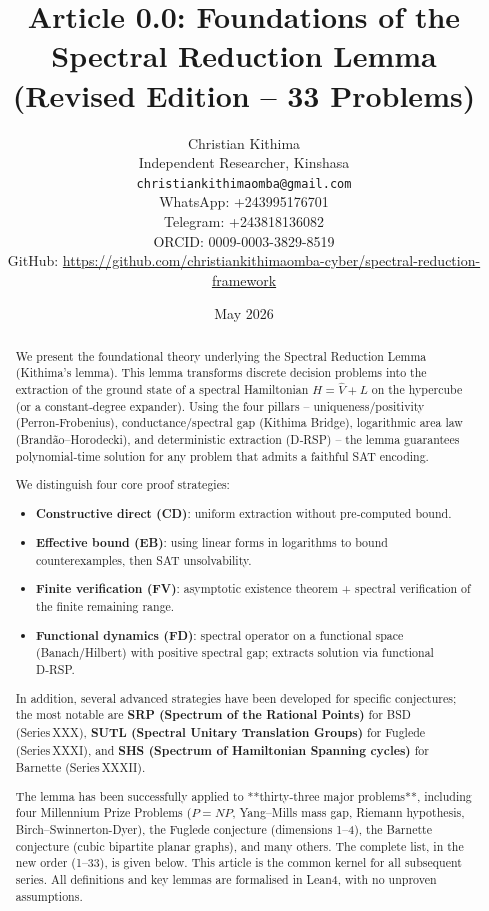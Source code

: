 \documentclass[11pt,a4paper]{article}
\title{Article 0.0: Foundations of the Spectral Reduction Lemma (Revised Edition – 33 Problems)}
\author{Christian Kithima \\
Independent Researcher, Kinshasa \\
\texttt{christiankithimaomba@gmail.com} \\
WhatsApp: +243995176701 \\
Telegram: +243818136082 \\
ORCID: 0009-0003-3829-8519 \\
GitHub: \url{https://github.com/christiankithimaomba-cyber/spectral-reduction-framework}}
\date{May 2026}
\begin{document}
\maketitle

\begin{abstract}
We present the foundational theory underlying the Spectral Reduction Lemma (Kithima's lemma). This lemma transforms discrete decision problems into the extraction of the ground state of a spectral Hamiltonian \(H = \hat{V} + L\) on the hypercube (or a constant‑degree expander). Using the four pillars – uniqueness/positivity (Perron‑Frobenius), conductance/spectral gap (Kithima Bridge), logarithmic area law (Brandão–Horodecki), and deterministic extraction (D‑RSP) – the lemma guarantees polynomial‑time solution for any problem that admits a faithful SAT encoding. 

We distinguish four core proof strategies:
\begin{itemize}
\item \textbf{Constructive direct (CD)}: uniform extraction without pre‑computed bound.
\item \textbf{Effective bound (EB)}: using linear forms in logarithms to bound counterexamples, then SAT unsolvability.
\item \textbf{Finite verification (FV)}: asymptotic existence theorem + spectral verification of the finite remaining range.
\item \textbf{Functional dynamics (FD)}: spectral operator on a functional space (Banach/Hilbert) with positive spectral gap; extracts solution via functional D‑RSP.
\end{itemize}
In addition, several advanced strategies have been developed for specific conjectures; the most notable are \textbf{SRP (Spectrum of the Rational Points)} for BSD (Series XXX), \textbf{SUTL (Spectral Unitary Translation Groups)} for Fuglede (Series XXXI), and \textbf{SHS (Spectrum of Hamiltonian Spanning cycles)} for Barnette (Series XXXII). 

The lemma has been successfully applied to **thirty‑three major problems**, including four Millennium Prize Problems (\(P = NP\), Yang–Mills mass gap, Riemann hypothesis, Birch–Swinnerton-Dyer), the Fuglede conjecture (dimensions 1–4), the Barnette conjecture (cubic bipartite planar graphs), and many others. The complete list, in the new order (1–33), is given below. This article is the common kernel for all subsequent series. All definitions and key lemmas are formalised in Lean4, with no unproven assumptions.
\end{abstract}
\end{document}
